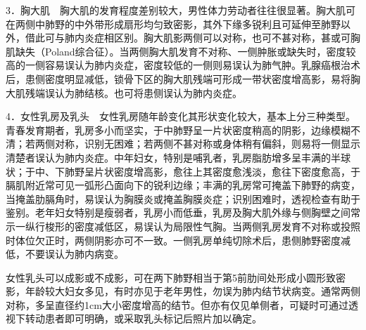 3．胸大肌　胸大肌的发育程度差别较大，男性体力劳动者往往很显著。胸大肌可在两侧中肺野的中外带形成扇形均匀致密影，其外下缘多锐利且可延伸至肺野以外，借此可与肺内炎症相区别。胸大肌影两侧可以对称，也可不甚对称，甚或可胸肌缺失（Poland综合征）。当两侧胸大肌发育不对称、一侧肿胀或缺失时，密度较高的一侧容易误认为肺内炎症，密度较低的一侧则易误认为肺气肿。乳腺癌根治术后，患侧密度明显减低，锁骨下区的胸大肌残端可形成一带状密度增高影，易将胸大肌残端误认为肺结核。也可将患侧误认为肺内炎症。

4．女性乳房及乳头　女性乳房随年龄变化其形状变化较大，基本上分三种类型。青春发育期者，乳房多小而坚实，于中肺野呈一片状密度稍高的阴影，边缘模糊不清；若两侧对称，识别无困难；若两侧不甚对称或身体稍有偏斜，则易将一侧显示清楚者误认为肺内炎症。中年妇女，特别是哺乳者，乳房脂肪增多呈丰满的半球状；于中、下肺野呈片状密度增高影，愈往上其密度愈浅淡，愈往下密度愈高，于膈肌附近常可见一弧形凸面向下的锐利边缘；丰满的乳房常可掩盖下肺野的病变，当掩盖肋膈角时，易误认为胸膜炎或掩盖胸膜炎症；识别困难时，透视检查有助于鉴别。老年妇女特别是瘦弱者，乳房小而低垂，乳房及胸大肌外缘与侧胸壁之间常示一纵行梭形的密度减低区，易误认为局限性气胸。当两侧乳房发育不对称或投照时体位欠正时，两侧阴影亦可不一致。一侧乳房单纯切除术后，患侧肺野密度减低，不要误认为肺内病变。

女性乳头可以成影或不成影，可在两下肺野相当于第5前肋间处形成小圆形致密影，年龄较大妇女多见，有时亦见于老年男性，勿误为肺内结节状病变。通常两侧对称，多呈直径约1cm大小密度增高的结节。但亦有仅见单侧者，可疑时可通过透视下转动患者即可明确，或采取乳头标记后照片加以确定。

